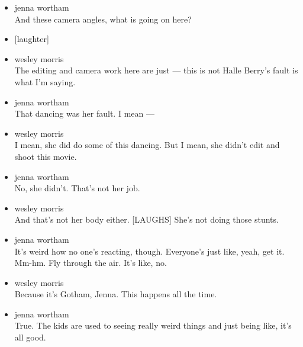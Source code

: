 \begin{itemize}
\item
  jenna wortham\\
  And these camera angles, what is going on here?
\item
  {[}laughter{]}
\item
  wesley morris\\
  The editing and camera work here are just --- this is not Halle
  Berry's fault is what I'm saying.
\item
  jenna wortham\\
  That dancing was her fault. I mean ---
\item
  wesley morris\\
  I mean, she did do some of this dancing. But I mean, she didn't edit
  and shoot this movie.
\item
  jenna wortham\\
  No, she didn't. That's not her job.
\item
  wesley morris\\
  And that's not her body either. {[}LAUGHS{]} She's not doing those
  stunts.
\item
  jenna wortham\\
  It's weird how no one's reacting, though. Everyone's just like, yeah,
  get it. Mm-hm. Fly through the air. It's like, no.
\item
  wesley morris\\
  Because it's Gotham, Jenna. This happens all the time.
\item
  jenna wortham\\
  True. The kids are used to seeing really weird things and just being
  like, it's all good.


\end{itemize}
